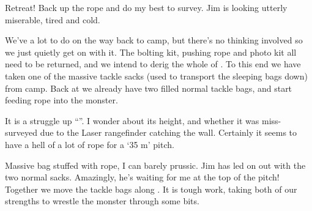 Retreat! Back up the rope and do my best to survey. Jim is looking
utterly miserable, tired and cold.


We've a lot to do on the way back to camp, but there's no thinking
involved so we just quietly get on with it. The bolting kit, pushing
rope and photo kit all need to be returned, and we intend to derig the
whole of . To this end we have taken one of the massive
tackle sacks (used to transport the sleeping bags down) from camp. Back
at  we already have two filled normal tackle bags, and
start feeding rope into the monster.

It is a struggle up ``''. I wonder about its height,
and whether it was miss-surveyed due to the Laser rangefinder catching
the wall. Certainly it seems to have a hell of a lot of rope for a `35
m' pitch.

Massive bag stuffed with rope, I can barely prussic. Jim has led on out
with the two normal sacks. Amazingly, he's waiting for me at the top of
the pitch! Together we move the tackle bags along . It
is tough work, taking both of our strengths to wrestle the monster
through some bits.




